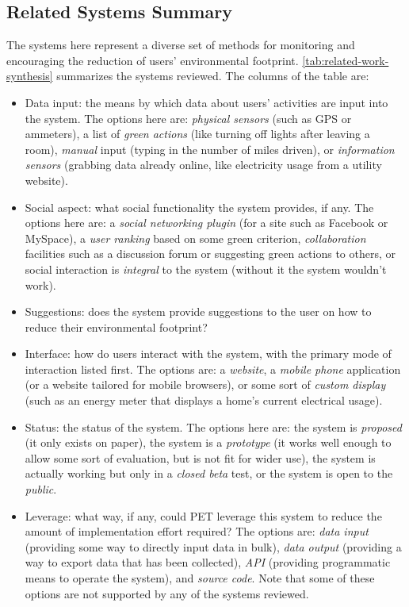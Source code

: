 \subsection{Related Systems Summary}

The systems here represent a diverse set of methods for monitoring and encouraging the reduction of users' environmental footprint. \autoref{tab:related-work-synthesis} summarizes the systems reviewed. The columns of the table are:

\begin{itemize}
	\item Data input: the means by which data about users' activities are input into the system. The options here are: \emph{physical sensors} (such as GPS or ammeters), a list of \emph{green actions} (like turning off lights after leaving a room), \emph{manual} input (typing in the number of miles driven), or \emph{information sensors} (grabbing data already online, like electricity usage from a utility website).
	\item Social aspect: what social functionality the system provides, if any.  The options here are: a \emph{social networking plugin} (for a site such as Facebook or MySpace), a \emph{user ranking} based on some green criterion, \emph{collaboration} facilities such as a discussion forum or suggesting green actions to others, or social interaction is \emph{integral} to the system (without it the system wouldn't work).
	\item Suggestions: does the system provide suggestions to the user on how to reduce their environmental footprint?
	\item Interface: how do users interact with the system, with the primary mode of interaction listed first. The options are: a \emph{website}, a \emph{mobile phone} application (or a website tailored for mobile browsers), or some sort of \emph{custom display} (such as an energy meter that displays a home's current electrical usage).
	\item Status: the status of the system. The options here are: the system is \emph{proposed} (it only exists on paper), the system is a \emph{prototype} (it works well enough to allow some sort of evaluation, but is not fit for wider use), the system is actually working but only in a \emph{closed beta} test, or the system is open to the \emph{public}.
	\item Leverage: what way, if any, could PET leverage this system to reduce the amount of implementation effort required? The options are: \emph{data input} (providing some way to directly input data in bulk), \emph{data output} (providing a way to export data that has been collected), \emph{API} (providing programmatic means to operate the system), and \emph{source code}. Note that some of these options are not supported by any of the systems reviewed.
\end{itemize}

